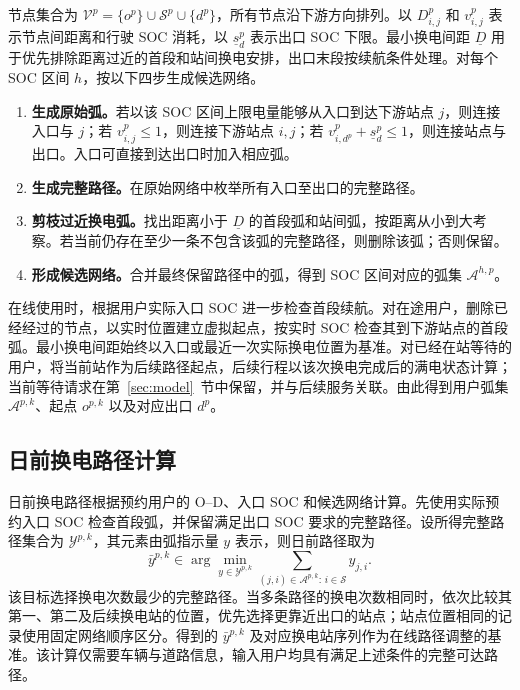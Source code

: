 \documentclass[12pt,a4paper,UTF8]{ctexart}
\numberwithin{equation}{section}
\begin{document}
节点集合为 $\mathcal V^p=\{o^p\}\cup\mathcal S^p\cup\{d^p\}$，所有节点沿下游方向排列。以 $D_{i,j}^p$ 和 $v_{i,j}^p$ 表示节点间距离和行驶 SOC 消耗，以 $\underline s_d^p$ 表示出口 SOC 下限。最小换电间距 $\underline D$ 用于优先排除距离过近的首段和站间换电安排，出口末段按续航条件处理。对每个 SOC 区间 $h$，按以下四步生成候选网络。
\begin{enumerate}[label=\textbf{步骤\arabic*.},leftmargin=4.2em]
\item \textbf{生成原始弧。}若以该 SOC 区间上限电量能够从入口到达下游站点 $j$，则连接入口与 $j$；若 $v_{i,j}^p\le1$，则连接下游站点 $i,j$；若 $v_{i,d^p}^p+\underline s_d^p\le1$，则连接站点与出口。入口可直接到达出口时加入相应弧。
\item \textbf{生成完整路径。}在原始网络中枚举所有入口至出口的完整路径。
\item \textbf{剪枝过近换电弧。}找出距离小于 $\underline D$ 的首段弧和站间弧，按距离从小到大考察。若当前仍存在至少一条不包含该弧的完整路径，则删除该弧；否则保留。
\item \textbf{形成候选网络。}合并最终保留路径中的弧，得到 SOC 区间对应的弧集 $\mathcal A^{h,p}$。
\end{enumerate}

在线使用时，根据用户实际入口 SOC 进一步检查首段续航。对在途用户，删除已经经过的节点，以实时位置建立虚拟起点，按实时 SOC 检查其到下游站点的首段弧。最小换电间距始终以入口或最近一次实际换电位置为基准。对已经在站等待的用户，将当前站作为后续路径起点，后续行程以该次换电完成后的满电状态计算；当前等待请求在第~\ref{sec:model}~节中保留，并与后续服务关联。由此得到用户弧集 $\mathcal A^{p,k}$、起点 $o^{p,k}$ 以及对应出口 $d^p$。

\subsection{日前换电路径计算}
\label{sec:dayahead}
日前换电路径根据预约用户的 O--D、入口 SOC 和候选网络计算。先使用实际预约入口 SOC 检查首段弧，并保留满足出口 SOC 要求的完整路径。设所得完整路径集合为 $\mathcal Y^{p,k}$，其元素由弧指示量 $y$ 表示，则日前路径取为
\begin{equation}
\bar y^{p,k}\in\arg\min_{y\in\mathcal Y^{p,k}}
\sum_{(j,i)\in\mathcal A^{p,k}:\,i\in\mathcal S}y_{j,i}.
\label{eq:dayahead_path}
\end{equation}
该目标选择换电次数最少的完整路径。当多条路径的换电次数相同时，依次比较其第一、第二及后续换电站的位置，优先选择更靠近出口的站点；站点位置相同的记录使用固定网络顺序区分。得到的 $\bar y^{p,k}$ 及对应换电站序列作为在线路径调整的基准。该计算仅需要车辆与道路信息，输入用户均具有满足上述条件的完整可达路径。
\end{document}
